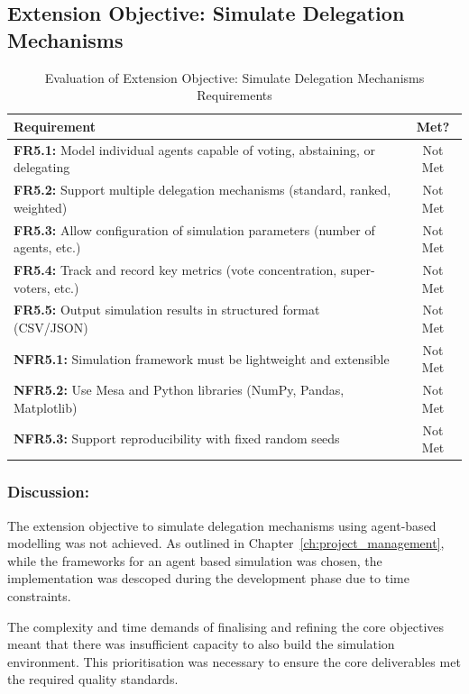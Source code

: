 \subsection{Extension Objective: Simulate Delegation Mechanisms}

\begin{table}[H]
\centering
\begin{tabular}{|p{9cm}|c|}
\hline
\textbf{Requirement} & \textbf{Met?} \\ \hline
\textbf{FR5.1:} Model individual agents capable of voting, abstaining, or delegating & Not Met \\ \hline
\textbf{FR5.2:} Support multiple delegation mechanisms (standard, ranked, weighted) & Not Met \\ \hline
\textbf{FR5.3:} Allow configuration of simulation parameters (number of agents, etc.) & Not Met \\ \hline
\textbf{FR5.4:} Track and record key metrics (vote concentration, super-voters, etc.) & Not Met \\ \hline
\textbf{FR5.5:} Output simulation results in structured format (CSV/JSON) & Not Met \\ \hline
\textbf{NFR5.1:} Simulation framework must be lightweight and extensible & Not Met \\ \hline
\textbf{NFR5.2:} Use Mesa and Python libraries (NumPy, Pandas, Matplotlib) & Not Met \\ \hline
\textbf{NFR5.3:} Support reproducibility with fixed random seeds & Not Met \\ \hline
\end{tabular}
\caption{Evaluation of Extension Objective: Simulate Delegation Mechanisms Requirements}
\label{tab:objective5_requirements}
\end{table}

\subsubsection{Discussion:}

The extension objective to simulate delegation mechanisms using agent-based modelling was not achieved. As outlined in Chapter~\ref{ch:project_management}, while the frameworks for an agent based simulation was chosen, the implementation was descoped during the development phase due to time constraints.

The complexity and time demands of finalising and refining the core objectives meant that there was insufficient capacity to also build the simulation environment. This prioritisation was necessary to ensure the core deliverables met the required quality standards.

